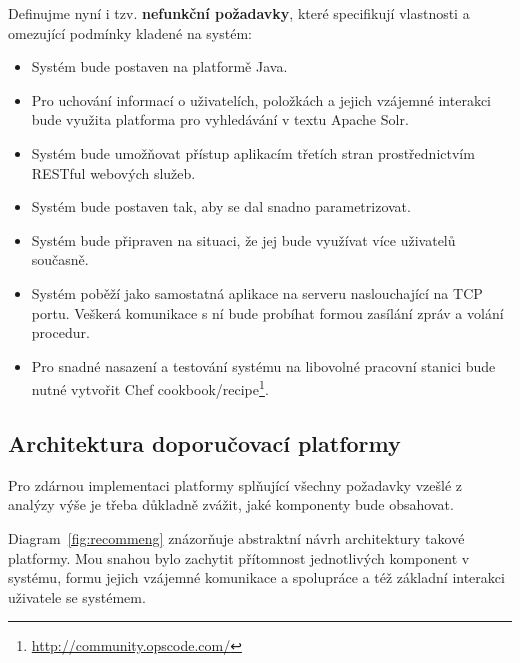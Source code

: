 \documentclass[thesis=M,czech]{FITthesis}[2014/05/07]
\begin{document}
Definujme nyní i tzv. \textbf{nefunkční požadavky}, které specifikují vlastnosti a omezující podmínky kladené na systém:

\begin{itemize}
	\item Systém bude postaven na platformě Java.
	\item Pro uchování informací o uživatelích, položkách a jejich vzájemné interakci bude využita platforma pro vyhledávání v textu Apache Solr.
	\item Systém bude umožňovat přístup aplikacím třetích stran prostřednictvím RESTful webových služeb.
	\item Systém bude postaven tak, aby se dal snadno parametrizovat. 
	\item Systém bude připraven na situaci, že jej bude využívat více uživatelů současně.
	\item Systém poběží jako samostatná aplikace na serveru naslouchající na TCP portu. Veškerá komunikace s ní bude probíhat formou zasílání zpráv a volání procedur.
	\item Pro snadné nasazení a testování systému na libovolné pracovní stanici bude nutné vytvořit Chef cookbook/recipe\footnote{\url{http://community.opscode.com/}}.
\end{itemize}

\subsection{Architektura doporučovací platformy}

Pro zdárnou implementaci platformy splňující všechny požadavky vzešlé z analýzy výše je třeba důkladně zvážit, jaké komponenty bude obsahovat.

Diagram~\ref{fig:recommeng} znázorňuje abstraktní návrh architektury takové platformy. Mou snahou bylo zachytit přítomnost jednotlivých komponent v systému, formu jejich vzájemné komunikace a spolupráce a též základní interakci uživatele se systémem.
\end{document}
